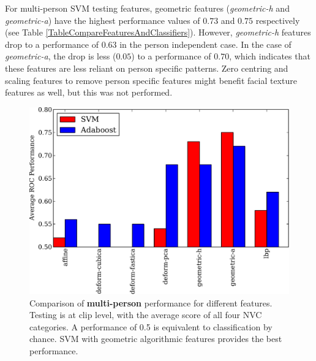 For multi-person \ac{SVM} testing features, geometric features (\textit{geometric-h} and \textit{geometric-a}) have the highest performance values of $0.73$ and $0.75$ respectively (see Table \ref{TableCompareFeaturesAndClassifiers}). However, \textit{geometric-h} features drop to a performance of $0.63$ in the person independent case. 
In the case of \textit{geometric-a}, the drop is less ($0.05$) to a performance of $0.70$, which indicates that these features are less reliant on person specific patterns. 
Zero centring and scaling features to remove person specific features might benefit facial texture features as well, but this was not performed.

\begin{figure}[tb]
\centering
\includegraphics[width = 0.6 \columnwidth]{nvcclass/compare-multi-person.pdf}
\caption[Comparison of \textbf{multi-person} performance for different features.]{Comparison of \textbf{multi-person} performance for different features. Testing is at clip level, with the average score of all four \ac{NVC} categories. A performance of 0.5 is equivalent to classification by chance. SVM with geometric algorithmic features provides the best performance.}
\label{CompareGraphMultiPerson}
\end{figure}


